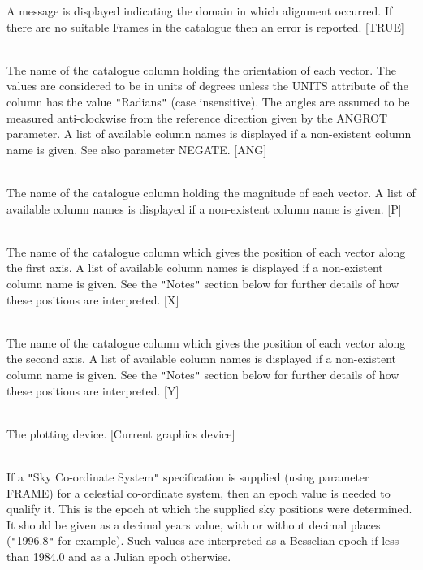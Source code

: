 \documentclass[twoside,11pt]{article}
\renewcommand{\_}{\texttt{\symbol{95}}}
\newcommand{\sstsubsection}[1]{ \item[{#1}] \mbox{} \\}
\newcommand{\sstsubsection}[1]{\item[{#1}]}
\begin{document}
{{{         A message is displayed indicating the domain in which alignment
         occurred. If there are no suitable Frames in the catalogue then an
         error is reported. [TRUE]
      }
      \sstsubsection{
         COLANG = LITERAL (Read)
      }{
         The name of the catalogue column holding the orientation of each
         vector. The values are considered to be in units of degrees unless
         the UNITS attribute of the column has the value {\tt "}Radians{\tt "} (case
         insensitive).  The angles are assumed to be measured anti-clockwise
         from the reference direction given by the ANGROT parameter. A list
         of available column names is displayed if a non-existent column name
         is given. See also parameter NEGATE. [ANG]
      }
      \sstsubsection{
         COLMAG = LITERAL (Read)
      }{
         The name of the catalogue column holding the magnitude of each
         vector. A list of available column names is displayed if a
         non-existent column name is given. [P]
      }
      \sstsubsection{
         COLX = LITERAL (Read)
      }{
         The name of the catalogue column which gives the position of each
         vector along the first axis. A list of available column names is
         displayed if a non-existent column name is given. See the {\tt "}Notes{\tt "}
         section below for further details of how these positions are
         interpreted. [X]
      }
      \sstsubsection{
         COLY = LITERAL (Read)
      }{
         The name of the catalogue column which gives the position of each
         vector along the second axis. A list of available column names is
         displayed if a non-existent column name is given. See the {\tt "}Notes{\tt "}
         section below for further details of how these positions are
         interpreted. [Y]
      }
      \sstsubsection{
         DEVICE = DEVICE (Read)
      }{
         The plotting device. [Current graphics device]
      }
      \sstsubsection{
         EPOCH = \_DOUBLE (Read)
      }{
         If a {\tt "}Sky Co-ordinate System{\tt "} specification is supplied (using
         parameter FRAME) for a celestial co-ordinate system, then an epoch
         value is needed to qualify it. This is the epoch at which the
         supplied sky positions were determined. It should be given as a
         decimal years value, with or without decimal places  ({\tt "}1996.8{\tt "} for
         example). Such values are interpreted as a Besselian epoch if less
         than 1984.0 and as a Julian epoch otherwise.
      }
      \sstsubsection{
         FILL = \_LOGICAL (Read)
}}}
\end{document}
